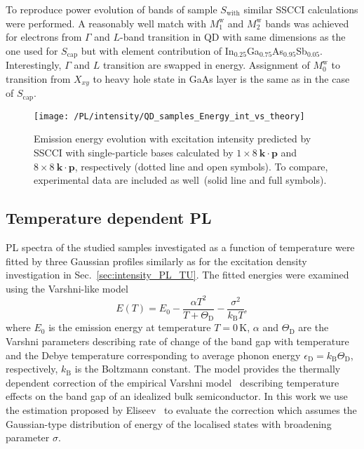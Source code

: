To reproduce power evolution of bands of sample $S_\mathrm{with}$ similar SSCCI calculations were performed. A reasonably well match with $M_1^\mathrm{w}$ and $M_2^\mathrm{w}$ bands was achieved for electrons from $\Gamma$ and $L$-band transition in QD with same dimensions as the one used for $S_\mathrm{cap}$ but with element contribution of In$_{0.25}$Ga$_{0.75}$As$_{0.95}$Sb$_{0.05}$. Interestingly, $\Gamma$ and $L$ transition are swapped in energy. Assignment of $M_0^\mathrm{w}$ to transition from $X_{xy}$ to heavy hole state in GaAs layer is the same as in the case of $S_\mathrm{cap}$.
%
\begin{figure}
	\centering
	\texttt{[image: /PL/intensity/QD\_samples\_Energy\_int\_vs\_theory]}
	\caption{Emission energy evolution with excitation intensity predicted by SSCCI with single-particle bases calculated by $1\times8~\mathbf{k \cdot p}$ and $8\times8~\mathbf{k \cdot p}$, respectively (dotted line and open symbols). To compare, experimental data are included as well~(solid line and full symbols).}
	\label{fig:QD_cap_int_expvstheory}
\end{figure}


\subsection{Temperature dependent PL}
\label{Sec:temp_PL_TU}
PL spectra of the studied samples investigated as a function of temperature were fitted by three Gaussian profiles similarly as for the excitation density investigation in Sec.~\ref{sec:intensity_PL_TU}. The fitted energies were examined using the Varshni-like model~\cite{Taiping2014}
%
\begin{equation}
E(T)=E_0-\frac{\alpha T^2}{T+\Theta_\mathrm{D}}-\frac{\sigma^2}{k_\mathrm{B}T}, \label{eq:Varshni-like}
\end{equation}
where $E_0$ is the emission energy at temperature $T=0\,\mathrm{K}$, $\alpha$ and $\Theta_\mathrm{D}$ are the Varshni parameters describing rate of change of the band gap with temperature and the Debye temperature corresponding to average phonon energy $\epsilon_\mathrm{D}=k_\mathrm{B}\Theta_\mathrm{D}$, respectively, $k_\mathrm{B}$ is the Boltzmann constant. The model provides the thermally dependent correction of the empirical Varshni model~\citep{Varshni} describing temperature effects on the band gap of an idealized bulk semiconductor. In this work we use the estimation proposed by Eliseev~\citep{Eliseev_apl2003_PLtemp} to evaluate the correction which assumes the Gaussian-type distribution of energy of the localised states with broadening parameter $\sigma$.

